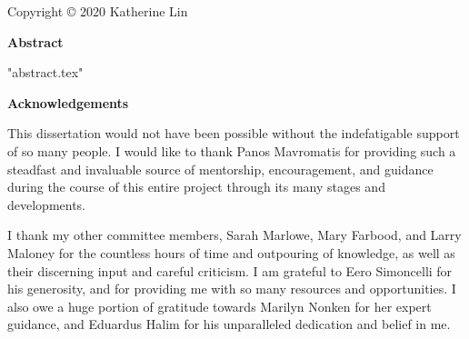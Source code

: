 \documentclass[11pt,letterpaper]{report}
\begin{document}
\newpage
\thispagestyle{empty}
\begin{center}
    Copyright \copyright{} 2020 Katherine Lin
\end{center}



\clearpage
\iftoggle{pretty}
{\singlespacing}
{\doublespacing}
\begin{center}
    \vspace*{0.3in}
    \textbf{Abstract}
\end{center}
 {"abstract.tex"}
\clearpage


\clearpage
{}
\begin{center}
    \vspace*{0.3in}
    \textbf{Acknowledgements}
\end{center}

This dissertation would not have been possible without the indefatigable support of so many people. I would like to thank Panos Mavromatis for providing such a steadfast and invaluable source of mentorship, encouragement, and guidance during the course of this entire project through its many stages and developments.

I thank my other committee members, Sarah Marlowe, Mary Farbood, and Larry Maloney for the countless hours of time and outpouring of knowledge, as well as their discerning input and careful criticism. I am grateful to Eero Simoncelli for his generosity, and for providing me with so many resources and opportunities. I also owe a huge portion of gratitude towards Marilyn Nonken for her expert guidance, and Eduardus Halim for his unparalleled dedication and belief in me.
\end{document}

